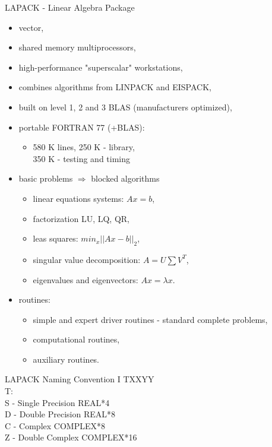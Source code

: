 	\begin{frame}[allowframebreaks]{LAPACK - Linear Algebra Package}
		\begin{itemize}
			\item vector,
			\item shared memory multiprocessors,
			\item high-performance "superscalar" workstations,
			\item combines algorithms from LINPACK and EISPACK,
			\item built on level 1, 2 and 3 BLAS (manufacturers optimized),
			\item portable FORTRAN 77 (+BLAS): 
			\begin{itemize}
				\item 580 K lines, 250 K - library, \\350 K - testing and timing
			\end{itemize}
			\item basic problems $\Rightarrow$ blocked algorithms
			\begin{itemize}
				\item linear equations systems: $Ax = b$, 
				\item factorization LU, LQ, QR,
				\item leas squares: $min_x ||Ax - b ||_2$,
				\item singular value decomposition: $A = U\sum V^T$,
				\item eigenvalues and eigenvectors: $Ax = \lambda x$.
			\end{itemize}
			\item routines:
			\begin{itemize}
				\item simple and expert driver routines - standard complete problems,
				\item computational routines,
				\item auxiliary routines.
			\end{itemize}
		\end{itemize}
	\end{frame}
	\begin{frame}{LAPACK Naming Convention I}
	TXXYY \\
	T: \\
	S - Single Precision REAL*4 \\
	D - Double Precision REAL*8 \\
	C - Complex COMPLEX*8 \\
	Z - Double Complex COMPLEX*16 
	\end{frame}
